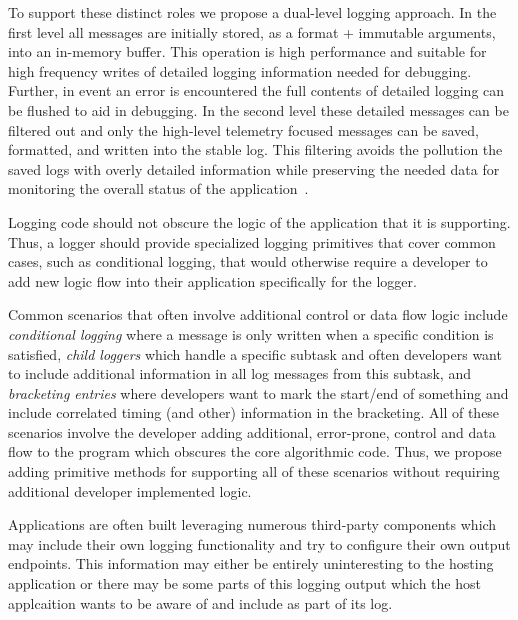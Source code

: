 To support these distinct roles we propose a dual-level logging approach. In the 
first level all messages are initially stored, as a format + immutable 
arguments, into an in-memory buffer. This operation is high performance and 
suitable for high frequency writes of detailed logging information needed for 
debugging. Further, in event an error is encountered the full contents of 
detailed logging can be flushed to aid in debugging. In the second level these 
detailed messages can be filtered out and only the high-level telemetry focused 
messages can be saved, formatted, and written into the stable log. This filtering 
avoids the pollution the saved logs with overly detailed information while 
preserving the needed data for monitoring the overall status of the application~\cite{logstudy,logstudy2}. 

\begin{design}
Logging code should not obscure the logic of the application that it is 
supporting. Thus, a logger should provide specialized logging primitives 
that cover common cases, such as conditional logging, that would otherwise 
require a developer to add new logic flow into their application specifically 
for the logger.
\end{design}

Common scenarios that often involve additional control or data flow logic 
include \emph{conditional logging} where a message is only written when a 
specific condition is satisfied, \emph{child loggers} which handle a specific 
subtask and often developers want to include additional information in all 
log messages from this subtask, and \emph{bracketing entries} where 
developers want to mark the start/end of something and include correlated 
timing (and other) information in the bracketing. All of these scenarios 
involve the developer adding additional, error-prone, control and data flow 
to the program which obscures the core algorithmic code. Thus, we propose 
adding primitive methods for supporting all of these scenarios without requiring 
additional developer implemented logic.

\begin{design}
Applications are often built leveraging numerous third-party components which 
may include their own logging functionality and try to configure their own 
output endpoints. This information may either be entirely uninteresting to the 
hosting application or there may be some parts of this logging output which the 
host applcaition wants to be aware of and include as part of its log.
\end{design}

